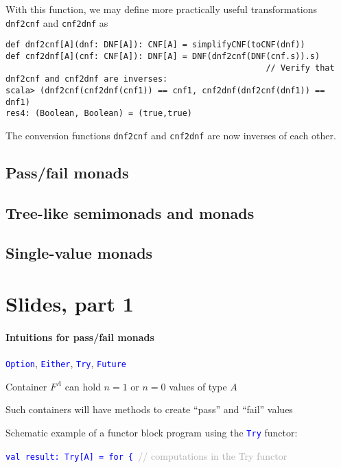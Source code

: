 With this function, we may define more practically useful transformations
\lstinline!dnf2cnf! and \lstinline!cnf2dnf! as
\begin{lstlisting}
def dnf2cnf[A](dnf: DNF[A]): CNF[A] = simplifyCNF(toCNF(dnf))
def cnf2dnf[A](cnf: CNF[A]): DNF[A] = DNF(dnf2cnf(DNF(cnf.s)).s)
                                                     // Verify that dnf2cnf and cnf2dnf are inverses:
scala> (dnf2cnf(cnf2dnf(cnf1)) == cnf1, cnf2dnf(dnf2cnf(dnf1)) == dnf1)
res4: (Boolean, Boolean) = (true,true)
\end{lstlisting}
The conversion functions \lstinline!dnf2cnf! and \lstinline!cnf2dnf!
are now inverses of each other.

\subsection{Pass/fail monads}

\subsection{Tree-like semimonads and monads}

\subsection{Single-value monads}

\section{Slides, part 1}

\paragraph{Intuitions for pass/fail monads}

\texttt{\textcolor{blue}{\footnotesize{}Option}}, \texttt{\textcolor{blue}{\footnotesize{}Either}},
\texttt{\textcolor{blue}{\footnotesize{}Try}}, \texttt{\textcolor{blue}{\footnotesize{}Future}}{\footnotesize\par}

Container $F^{A}$ can hold $n=1$ or $n=0$ values of type $A$

Such containers will have methods to create ``pass'' and ``fail''
values

Schematic example of a functor block program using the \texttt{\textcolor{blue}{\footnotesize{}Try}}
functor:

\texttt{\textcolor{blue}{\footnotesize{}val result: Try{[}A{]} = for
\{ }}\textcolor{darkgray}{\footnotesize{}// computations in the Try
functor}{\footnotesize\par}

